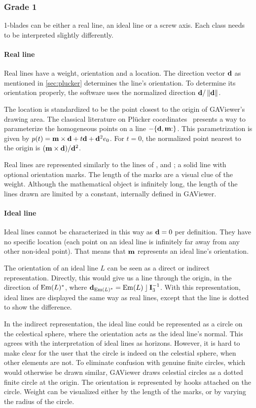 \subsubsection{Grade 1}
1-blades can be either a real line, an ideal line or a screw axis.  Each class needs to be interpreted slightly differently.

\paragraph{Real line}
Real lines have a weight, orientation and a location.  The direction vector $\mathbf{d}$ as mentioned in \autoref{sec:plucker} determines the line's orientation.  To determine its orientation properly, the software uses the normalized direction $\mathbf{d} / \left\|\mathbf{d}\right\|$.

The location is standardized to be the point closest to the origin of GAViewer's drawing area.  The classical literature on Pl\"ucker coordinates~\cite{Shoemake} presents a way to parameterize the homogeneous points on a line $-\plucker{\V{d}, \V{m}}$.  This parametrization is given by $p(t) = \mathbf{m} \times \mathbf{d} + t \mathbf{d} + \mathbf{d}^2e_0$.  For $t = 0$, the normalized point nearest to the origin is $(\mathbf{m} \times \mathbf{d}) / \mathbf{d}^2$.

Real lines are represented similarly to the lines of \pga{}, \cga{} and \cbga{}; a solid line with optional orientation marks.  The length of the marks are a visual clue of the weight.  Although the mathematical object is infinitely long, the length of the lines drawn are limited by a constant, internally defined in GAViewer.

\paragraph{Ideal line}
Ideal lines cannot be characterized in this way as $\mathbf{d} = 0$ per definition.  They have no specific location (each point on an ideal line is infinitely far away from any other non-ideal point).  That means that $\mathbf{m}$ represents an ideal line's orientation.

The orientation of an ideal line $L$ can be seen as a direct or indirect representation.  Directly, this would give us a line through the origin, in the direction of $\operatorname{Em}(L)^\ast$, where $\mathbf{d}_{\operatorname{Em}(L)^\ast} = \operatorname{Em}(L) \mathbin{\rfloor} \mathbf{I}_3^{-1}$.  With this representation, ideal lines are displayed the same way as real lines, except that the line is dotted to show the difference. 

In the indirect representation, the ideal line could be represented as a circle on the celestical sphere, where the orientation acts as the ideal line's normal.  This agrees with the interpretation of ideal lines as horizons.  However, it is hard to make clear for the user that the circle is indeed on the celestial sphere, when other elements are not.  To eliminate confusion with genuine finite circles, which would otherwise be drawn similar, GAViewer draws celestial circles as a dotted finite circle at the origin.  The orientation is represented by hooks attached on the circle.  Weight can be visualized either by the length of the marks, or by varying the radius of the circle.

